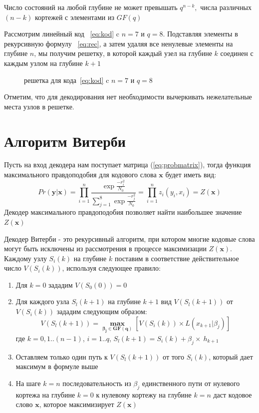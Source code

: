 \documentclass{ITaSconf}
\begin{document}
	Число состояний на любой глубине не может превышать $q^{n-k},$ числа различных $(n-k)$ кортежей с элементами из $GF(q)$
	
	Рассмотрим линейный код ~\eqref{eq:kod} c $n=7$ и $q=8$. Подставляя элементы в рекурсивную формулу 
~\eqref{eq:rec}, а затем удаляя  все ненулевые элементы на глубине $n$, мы получим решетку, в которой каждый узел на глубине $k$ соединен с каждым узлом на глубине $k+1$
	  
\begin{figure} [h]
\caption{решетка для кода~\eqref{eq:kod} c $n=7$ и $q=8$}
\label{fig:image}
\end{figure}
Отметим, что для декодирования нет необходимости вычеркивать нежелательные места узлов в решетке.

\section{Алгоритм Витерби}
\label{sec:viterbi}

Пусть на вход декодера нам поступает матрица (\ref{eq:probmatrix}), тогда функция максимального правдоподобия для кодового слова $\mathbold{x}$ будет иметь вид:
\begin{equation}\label{eq:LLR}
Pr(\mathbold{y}|\mathbold{x})=\prod_{i=1}^n\frac{\exp{\frac{-r_i^2}{N_0}}}{{\sum_{j=1}^8\exp{\frac{-r_j^2}{N_0}}}}=\prod_{i=1}^n z_i(y_i,x_i)= Z(\mathbold{x})
 \end{equation}
Декодер максимального правдоподобия позволяет найти наибольшее значение $Z(\mathbold{x})$

Декодер Витерби - это рекурсивный алгоритм, при котором многие кодовые слова могут быть исключены из рассмотрения в процессе максимизации $Z(\mathbold{x})$.
Каждому узлу $S_i(k)$ на глубине $k$ поставим в соответствие действительное число   $V(S_i(k))$, используя следующее правило:
\begin{enumerate}
 \item Для $k=0$ зададим $V(S_0(0))=0$

\item Для каждого узла $S_l(k+1)$ на глубине $k+1 $ вид  $V(S_l(k+1))$ от $V(S_i(k))$ зададим следующим образом:
\begin{equation}\label{eq:LR}
V(S_l(k+1)) = \boldsymbol{\max_{\beta_j \in GF(q)}} [V(S_i(k))\times L(x_{k+1}|\beta_j)]
 \end{equation}
 где $k=0,1..(n-1)$, $i=1..q$, $S_l(k+1)=S_i(k)+\beta_j\times\ h_{k+1}$
 
 \item Оставляем только один путь к $V(S_l(k+1))$ от того $S_i(k)$, который дает максимум в формуле выше
 \item На шаге $k=n$ последовательность  из $\beta_j$ единственного пути от нулевого кортежа на глубине $k=0$ к нулевому кортежу на глубине $k=n$ даст кодовое слово $\mathbold{x}$, которое максимизирует $Z(\mathbold{x})$
\end{enumerate}  
\end{document}

